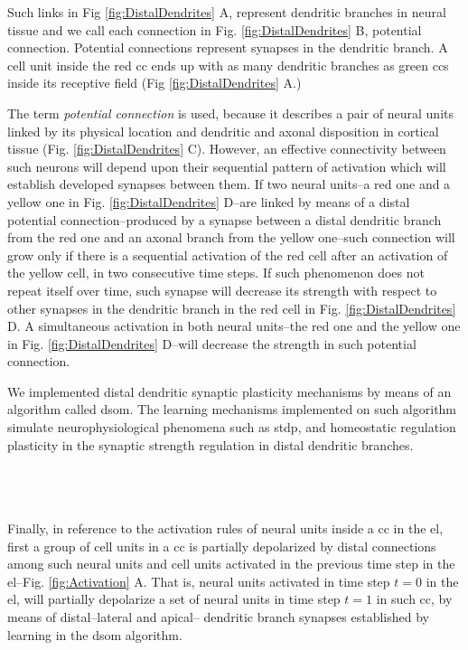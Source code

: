 \documentclass[10pt,letterpaper]{article}
\begin{document}
\pagebreak

Such links in Fig \ref{fig:DistalDendrites} A, represent dendritic branches in neural tissue and
we call
each connection in Fig. \ref{fig:DistalDendrites} B,
potential connection.
Potential connections represent synapses in the dendritic branch.
A cell unit inside the red \gls{cc} ends up with as many dendritic branches as green \glspl{cc} inside its receptive field (Fig \ref{fig:DistalDendrites} A.)

The term \emph{potential connection} is used, because it describes a pair of neural units linked by its physical location and dendritic and axonal disposition in cortical tissue (Fig. \ref{fig:DistalDendrites} C). However, an effective connectivity between such neurons will depend upon their sequential pattern of activation which will establish developed synapses between them. If two neural units--a red one and a yellow one in Fig. \ref{fig:DistalDendrites} D--are linked by means of a distal potential connection--produced by a synapse between a distal dendritic branch from the red one and an axonal branch from the yellow one--such connection will grow only if there is a sequential activation of the red cell after an activation of the yellow cell, in two consecutive time steps. If such phenomenon does not repeat itself over time, such synapse will decrease its strength with respect to other synapses in the dendritic branch in the red cell in Fig. \ref{fig:DistalDendrites} D. A simultaneous activation in both neural units--the red one and the yellow one in Fig. \ref{fig:DistalDendrites} D--will decrease the strength in such potential connection.

We implemented distal dendritic synaptic plasticity mechanisms by means of an algorithm called \gls{dsom}.
The learning mechanisms implemented on such algorithm simulate neurophysiological phenomena
such as \gls{stdp}, and homeostatic regulation plasticity in the synaptic strength regulation in
distal dendritic branches.







~\\
~\\
~\\

Finally, in reference to the activation rules of neural units inside a \gls{cc} in the \gls{el},
first a group of cell units in a \gls{cc} is partially depolarized 
by distal connections among such neural units and cell units activated in the
previous time step in the \gls{el}--Fig. \ref{fig:Activation} A.
That is, neural units activated in time step $t=0$ in the \gls{el}, will partially depolarize
a set of neural units in time step $t=1$ in such \gls{cc}, by means of distal--lateral and apical--
dendritic branch synapses established by learning in the \gls{dsom} algorithm.
\end{document}
